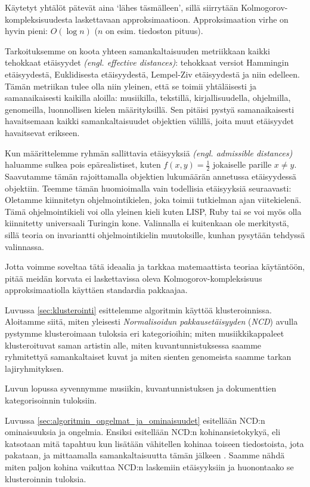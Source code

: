 \documentclass[12pt,finnish]{tktltiki2}
\theoremstyle{definition}
\theoremstyle{remark}
\newcommand{\engl}[1]{\emph{(engl. #1)}}
\begin{document}
  Käytetyt yhtälöt pätevät aina `lähes täsmälleen', sillä siirrytään Kolmogorov-kompleksisuudesta laskettavaan approksimaatioon. Approksimaation virhe on hyvin pieni: $O(\log n)$ ($n$ on esim. tiedoston pituus).

  Tarkoituksemme on koota yhteen samankaltaisuuden metriikkaan kaikki tehokkaat etäisyydet \engl{effective distances}: tehokkaat versiot Hammingin etäisyydestä, Euklidisesta etäisyydestä, Lempel-Ziv etäisyydestä ja niin edelleen.
  Tämän metriikan tulee olla niin yleinen, että se toimii yhtäläisesti ja samanaikaisesti kaikilla aloilla: musiikilla, tekstillä, kirjallisuudella, ohjelmilla, genomeilla, luonnollisen kielen määrityksillä.
  Sen pitäisi pystyä samanaikaisesti havaitsemaan kaikki samankaltaisuudet objektien välillä, joita muut etäisyydet havaitsevat erikseen.

  Kun määrittelemme ryhmän sallittavia etäisyyksiä \engl{admissible distances} haluamme sulkea pois epärealistiset, kuten $f(x,y) = \frac{1}{2}$ jokaiselle parille $x \neq y$.
  Saavutamme tämän rajoittamalla objektien lukumäärän annetussa etäisyydessä objektiin.
  Teemme tämän huomioimalla vain todellisia etäisyyksiä seuraavasti: Oletamme kiinnitetyn ohjelmointikielen, joka toimii tutkielman ajan viitekielenä.
  Tämä ohjelmointikieli voi olla yleinen kieli kuten LISP, Ruby tai se voi myös olla kiinnitetty universaali Turingin kone. \cite{CV05,cilibrasi2007google}
  Valinnalla ei kuitenkaan ole merkitystä, sillä teoria on invariantti ohjelmointikielin muutoksille, kunhan pysytään tehdyssä valinnassa.


Jotta voimme soveltaa tätä ideaalia ja tarkkaa matemaattista teoriaa käytäntöön, pitää meidän korvata ei laskettavissa oleva Kolmogorov-kompleksisuus approksimaatiolla käyttäen standardia pakkaajaa.

\label{par:intro-3}
  Luvussa \ref{sec:klusterointi} esittelemme algoritmin käyttöä klusteroinnissa.
  Aloitamme siitä, miten yleisesti \emph{Normalisoidun pakkausetäisyyden} (\emph{NCD}) avulla pystymme klusteroimaan tuloksia eri kategorioihin; miten musiikkikappaleet klusteroituvat saman artistin alle, miten kuvantunnistuksessa saamme ryhmitettyä samankaltaiset kuvat ja miten sienten genomeista saamme tarkan lajiryhmityksen.


  Luvun lopussa syvennymme musiikin, kuvantunnistuksen ja dokumenttien kategorisoinnin tuloksiin.


\label{par:intro-4}
  Luvussa \ref{sec:algoritmin_ongelmat_ja_ominaisuudet} esitellään NCD:n ominaisuuksia ja ongelmia.
  Ensiksi esitellään NCD:n kohinansietokykyä, eli katsotaan mitä tapahtuu kun lisätään vähitellen kohinaa toiseen tiedostoista, jota pakataan, ja mittaamalla samankaltaisuutta tämän jälkeen \cite{4167725}.
  Saamme nähdä miten paljon kohina vaikuttaa NCD:n laskemiin etäisyyksiin ja huonontaako se klusteroinnin tuloksia.
\end{document}

